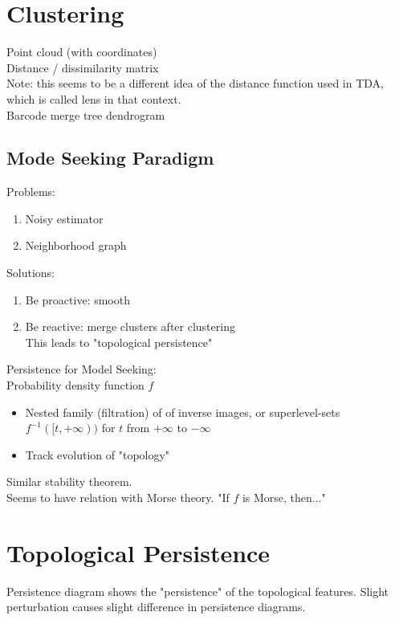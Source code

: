 \documentclass[10pt,a4paper]{article}
\begin{document}
\section{Clustering}
Point cloud (with coordinates)\\

Distance / dissimilarity matrix\\

Note: this seems to be a different idea of the distance function used in TDA, which is called lens in that context.\\

Barcode \textrightarrow merge tree \textrightarrow dendrogram

\subsection{Mode Seeking Paradigm}
Problems:
\begin{enumerate}
	\item Noisy estimator
	\item Neighborhood graph
\end{enumerate}
Solutions:
\begin{enumerate}
	\item Be proactive: smooth
	\item Be reactive: merge clusters after clustering\\
		  This leads to "topological persistence"
\end{enumerate}

Persistence for Model Seeking:\\
Probability density function $f$\\
\begin{itemize}
	\item Nested family (filtration) of of inverse images, or superlevel-sets $f^{-1}([t,+\infty))$ for 			  $t$ from $+\infty$ to $-\infty$
	\item Track evolution of "topology"
\end{itemize}
Similar stability theorem.\\
Seems to have relation with Morse theory. "If $f$ is Morse, then..."\\

\section{Topological Persistence}
Persistence diagram shows the "persistence" of the topological features.
Slight perturbation causes slight difference in persistence diagrams.
\end{document}
